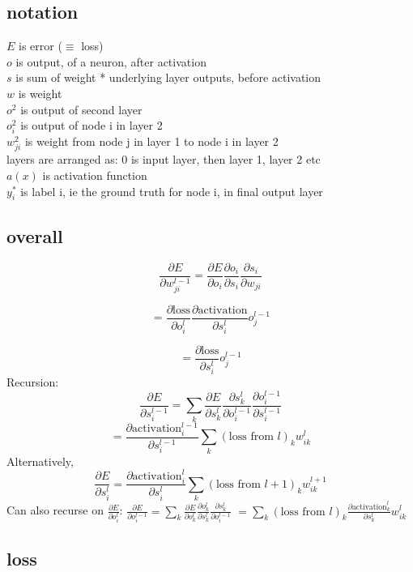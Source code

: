 \documentclass[a4paper,12pt,fleqn]{article}
\newcommand{\partialderivative}[2]{\frac{\partial #1}{\partial #2}}
\begin{document}
\subsection*{notation}

$E$ is error ($\equiv$ loss) \\
$o$ is output, of a neuron, after activation \\
$s$ is sum of weight * underlying layer outputs, before activation \\
$w$ is weight \\
$o^2$ is output of second layer \\
$o^2_i$ is output of node i in layer 2 \\
$w^2_{ji}$ is weight from node j in layer 1 to node i in layer 2\\
layers are arranged as: 0 is input layer, then layer 1, layer 2 etc \\ 
$a(x)$ is activation function\\
$y^*_i$ is label i, ie the ground truth for node i, in final output layer

\subsection*{overall}

\[ \partialderivative{E}{w^{l-1}_{ji}} = \partialderivative{E}{o_i} \partialderivative{o_i}{s_i} \partialderivative{s_i}{w_{ji}} \]

\[ = \partialderivative{\text{loss}}{o^l_i} \partialderivative{\text{activation}}{s^l_i} o^{l-1}_j \]

\[ = \partialderivative{\text{loss}}{s^l_i} o^{l-1}_j \]
Recursion:
\[ \partialderivative{E}{s^{l-1}_i} = \sum_k \partialderivative{E}{s^{l}_k} \partialderivative{s^{l}_k}{o^{l-1}_i} \partialderivative{o^{l-1}_i}{s^{l-1}_i}  \]
\[ = \partialderivative{\text{activation}^{l-1}_i}{s^{l-1}_i} \sum_k (\text{loss from $l$})_k w^l_{ik} \]
Alternatively, \[ \partialderivative{E}{s^{l}_i} = \partialderivative{\text{activation}^{l}_i}{s^{l}_i} \sum_k (\text{loss from $l+1$})_k w^{l+1}_{ik} \]
Can also recurse on $\partialderivative{E}{o^l_i}$: $\partialderivative{E}{o^{l-1}_i} = \sum_k \partialderivative{E}{o^{l}_k} \partialderivative{o^l_k}{s^l_k}  \partialderivative{s^l_k}{o^{l-1}_i}$ $=\sum_k (\text{loss from $l$})_k \partialderivative{\text{activation}^l_k}{s^l_k} w^l_{ik} $

\subsection*{loss}
\end{document}
